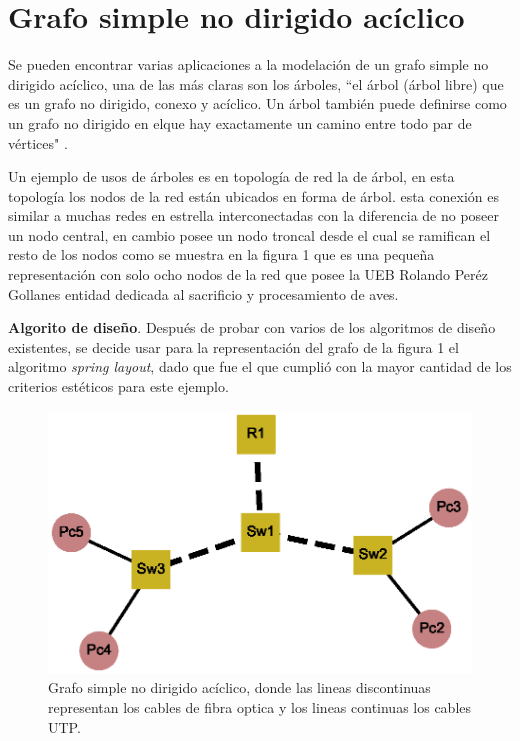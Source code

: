 \documentclass{article}
\begin{document}
\section{ Grafo simple no dirigido acíclico}
Se pueden encontrar varias aplicaciones a la modelación de un grafo simple no dirigido acíclico, una de las más claras son los árboles, “el árbol (árbol libre) que es un grafo no dirigido, conexo y acíclico. Un árbol también puede definirse como un grafo no dirigido en elque hay exactamente un camino entre todo par de vértices" \cite{gf1}. \linebreak

Un ejemplo de usos de árboles es en topología de red la de árbol, en esta topología los nodos de la red están ubicados en forma de árbol. esta conexión es similar a muchas redes en estrella interconectadas con la diferencia de no poseer un nodo central, en cambio posee un nodo troncal desde el cual se ramifican el resto de los nodos como se muestra en la figura 1 que es una pequeña representación con solo ocho nodos de la red que posee la UEB Rolando Peréz Gollanes entidad dedicada al sacrificio y procesamiento de aves.\linebreak 

\textbf{Algorito de diseño}.\linebreak
Después de probar con varios de los algoritmos de diseño existentes, se decide usar para la representación del grafo de la figura 1 el algoritmo \textit{spring layout}, dado que fue el que cumplió con la mayor cantidad de los criterios estéticos para este ejemplo.

 
 
\begin{center}

\end{center}
\begin{figure}[ht]
\begin{center}
\includegraphics[scale=0.7]{Graf1_spring_layout.eps}
\caption{Grafo simple no dirigido acíclico, donde las lineas discontinuas representan los cables de fibra optica y los lineas continuas los cables UTP.}
\end{center}
\end{figure}
\end{document}
